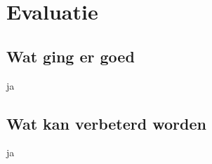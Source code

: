 \chapter{Evaluatie}
\label{Evaluatie}

\section{Wat ging er goed}

ja

\section{Wat kan verbeterd worden}

ja